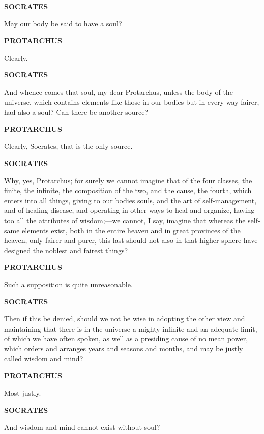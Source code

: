 \documentclass[11pt,letter]{article}
\begin{document}
\par \textbf{SOCRATES}
\par   May our body be said to have a soul?

\par \textbf{PROTARCHUS}
\par   Clearly.

\par \textbf{SOCRATES}
\par   And whence comes that soul, my dear Protarchus, unless the body of the universe, which contains elements like those in our bodies but in every way fairer, had also a soul? Can there be another source?

\par \textbf{PROTARCHUS}
\par   Clearly, Socrates, that is the only source.

\par \textbf{SOCRATES}
\par   Why, yes, Protarchus; for surely we cannot imagine that of the four classes, the finite, the infinite, the composition of the two, and the cause, the fourth, which enters into all things, giving to our bodies souls, and the art of self-management, and of healing disease, and operating in other ways to heal and organize, having too all the attributes of wisdom;—we cannot, I say, imagine that whereas the self-same elements exist, both in the entire heaven and in great provinces of the heaven, only fairer and purer, this last should not also in that higher sphere have designed the noblest and fairest things?

\par \textbf{PROTARCHUS}
\par   Such a supposition is quite unreasonable.

\par \textbf{SOCRATES}
\par   Then if this be denied, should we not be wise in adopting the other view and maintaining that there is in the universe a mighty infinite and an adequate limit, of which we have often spoken, as well as a presiding cause of no mean power, which orders and arranges years and seasons and months, and may be justly called wisdom and mind?

\par \textbf{PROTARCHUS}
\par   Most justly.

\par \textbf{SOCRATES}
\par   And wisdom and mind cannot exist without soul?
\end{document}
